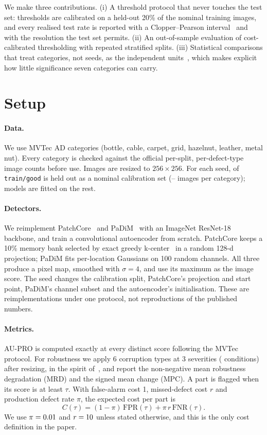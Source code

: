 \documentclass[11pt,letterpaper]{article}
\begin{document}
We make three contributions. (i) A threshold protocol that never touches the test set: thresholds are
calibrated on a held-out 20\% of the nominal training images, and every realised test rate is reported with a
Clopper--Pearson interval~\cite{clopper1934use} and with the resolution the test set permits. (ii) An
out-of-sample evaluation of cost-calibrated thresholding with repeated stratified splits. (iii) Statistical
comparisons that treat categories, not seeds, as the independent units~\cite{demsar2006statistical}, which
makes explicit how little significance seven categories can carry.

\section{Setup}
\paragraph{Data.} We use \NumCategories{} MVTec AD categories (bottle, cable, carpet, grid, hazelnut, leather,
metal nut). Every category is checked against the official per-split, per-defect-type image counts before
use. Images are resized to $256\times256$. For each seed, \CalibFraction{} of \texttt{train/good} is held out
as a nominal calibration set (\MinCalibNominal--\MaxCalibNominal{} images per category); models are fitted on
the rest.

\paragraph{Detectors.} We reimplement PatchCore~\cite{roth2022towards} and PaDiM~\cite{defard2021padim} with an
ImageNet ResNet-18 backbone, and train a convolutional autoencoder from scratch. PatchCore keeps a 10\%
memory bank selected by exact greedy k-center~\cite{sener2018active} in a random 128-d projection; PaDiM fits
per-location Gaussians on 100 random channels. All three produce a pixel map, smoothed with $\sigma=4$, and
use its maximum as the image score. The seed changes the calibration split, PatchCore's projection and start
point, PaDiM's channel subset and the autoencoder's initialisation. These are reimplementations under one
protocol, not reproductions of the published numbers.

\paragraph{Metrics.} AU-PRO is computed exactly at every distinct score following the MVTec protocol. For
robustness we apply 6 corruption types at 3 severities (\NumConditions{} conditions) after resizing, in the spirit
of~\cite{hendrycks2019benchmarking}, and report the non-negative mean robustness degradation (MRD) and the
signed mean change (MPC). A part is flagged when its score is at least $\tau$. With false-alarm cost 1,
missed-defect cost $r$ and production defect rate $\pi$, the expected cost per part is
\begin{equation}
C(\tau) = (1-\pi)\,\mathrm{FPR}(\tau) + \pi\, r\, \mathrm{FNR}(\tau).
\end{equation}
We use $\pi=0.01$ and $r=10$ unless stated otherwise, and this is the only cost
definition in the paper.
\end{document}
